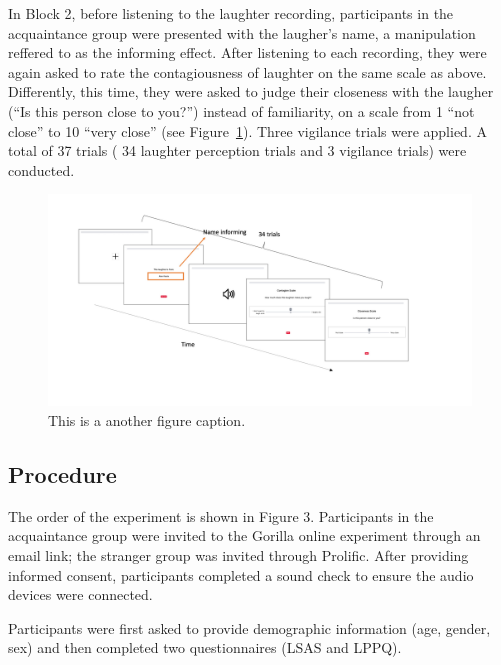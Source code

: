In Block 2, before listening to the laughter recording, participants in the acquaintance group were presented with the laugher’s name, a manipulation reffered to as the informing effect. After listening to each recording, they were again asked to rate the contagiousness of laughter on the same scale as above. Differently, this time, they were asked to judge their closeness with the laugher (“Is this person close to you?”) instead of familiarity, on a scale from 1 “not close” to 10 “very close” (see Figure~\ref{fig:block}). Three vigilance trials were applied. A total of 37 trials ( 34 laughter perception trials and 3 vigilance trials) were conducted.

\begin{figure}[h!] 
\centering
\includegraphics[width=1\textwidth]{Slide2.jpeg}
\caption{\label{fig:block}This is a another figure caption.}
\end{figure}

\subsection{Procedure}
The order of the experiment is shown in Figure 3. Participants in the acquaintance group were invited to the Gorilla online experiment through an email link; the stranger group was invited through Prolific. After providing informed consent, participants completed a sound check to ensure the audio devices were connected.

Participants were first asked to provide demographic information (age, gender, sex) and then completed two questionnaires (LSAS and LPPQ).

